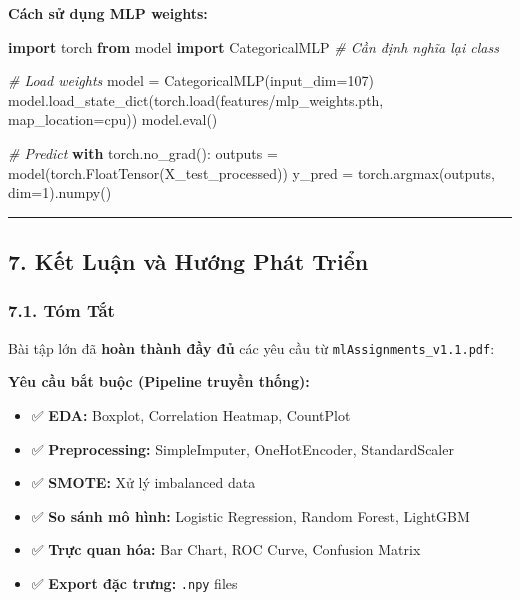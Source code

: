 \documentclass[
]{article}
\newenvironment{Shaded}{}{}
\newcommand{\BuiltInTok}[1]{\textcolor[rgb]{0.00,0.50,0.00}{#1}}
\newcommand{\CommentTok}[1]{\textcolor[rgb]{0.38,0.63,0.69}{\textit{#1}}}
\newcommand{\ControlFlowTok}[1]{\textcolor[rgb]{0.00,0.44,0.13}{\textbf{#1}}}
\newcommand{\DecValTok}[1]{\textcolor[rgb]{0.25,0.63,0.44}{#1}}
\newcommand{\ImportTok}[1]{\textcolor[rgb]{0.00,0.50,0.00}{\textbf{#1}}}
\newcommand{\NormalTok}[1]{#1}
\newcommand{\OperatorTok}[1]{\textcolor[rgb]{0.40,0.40,0.40}{#1}}
\newcommand{\StringTok}[1]{\textcolor[rgb]{0.25,0.44,0.63}{#1}}
\providecommand{\tightlist}{%
  \setlength{\itemsep}{0pt}\setlength{\parskip}{0pt}}
\begin{document}
\textbf{Cách sử dụng MLP weights:}

\begin{Shaded}
\begin{Highlighting}[]
\ImportTok{import}\NormalTok{ torch}
\ImportTok{from}\NormalTok{ model }\ImportTok{import}\NormalTok{ CategoricalMLP  }\CommentTok{\# Cần định nghĩa lại class}

\CommentTok{\# Load weights}
\NormalTok{model }\OperatorTok{=}\NormalTok{ CategoricalMLP(input\_dim}\OperatorTok{=}\DecValTok{107}\NormalTok{)}
\NormalTok{model.load\_state\_dict(torch.load(}\StringTok{\textquotesingle{}features/mlp\_weights.pth\textquotesingle{}}\NormalTok{, map\_location}\OperatorTok{=}\StringTok{\textquotesingle{}cpu\textquotesingle{}}\NormalTok{))}
\NormalTok{model.}\BuiltInTok{eval}\NormalTok{()}

\CommentTok{\# Predict}
\ControlFlowTok{with}\NormalTok{ torch.no\_grad():}
\NormalTok{    outputs }\OperatorTok{=}\NormalTok{ model(torch.FloatTensor(X\_test\_processed))}
\NormalTok{    y\_pred }\OperatorTok{=}\NormalTok{ torch.argmax(outputs, dim}\OperatorTok{=}\DecValTok{1}\NormalTok{).numpy()}
\end{Highlighting}
\end{Shaded}

\begin{center}\rule{0.5\linewidth}{0.5pt}\end{center}

\subsection{7. Kết Luận và Hướng Phát
Triển}\label{7-kux1ebft-luux1eadn-vuxe0-hux1b0ux1edbng-phuxe1t-triux1ec3n}

\subsubsection{7.1. Tóm Tắt}\label{71-tuxf3m-tux1eaft}

Bài tập lớn đã \textbf{hoàn thành đầy đủ} các yêu cầu từ
\texttt{mlAssignments\_v1.1.pdf}:

\textbf{Yêu cầu bắt buộc (Pipeline truyền thống):}

\begin{itemize}
\tightlist
\item
  ✅ \textbf{EDA:} Boxplot, Correlation Heatmap, CountPlot
\item
  ✅ \textbf{Preprocessing:} SimpleImputer, OneHotEncoder,
  StandardScaler
\item
  ✅ \textbf{SMOTE:} Xử lý imbalanced data
\item
  ✅ \textbf{So sánh mô hình:} Logistic Regression, Random Forest,
  LightGBM
\item
  ✅ \textbf{Trực quan hóa:} Bar Chart, ROC Curve, Confusion Matrix
\item
  ✅ \textbf{Export đặc trưng:} \texttt{.npy} files
\end{itemize}
\end{document}
